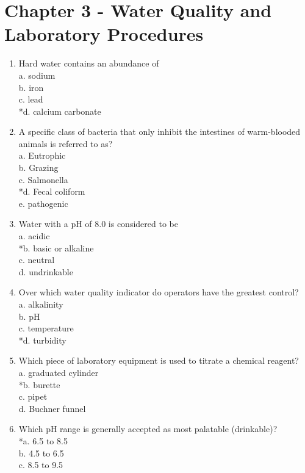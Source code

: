 \newpage
\section{Chapter 3 - Water Quality and Laboratory Procedures}
\begin{enumerate}[1.]

\item Hard water contains an abundance of\\
a. sodium\\
b. iron\\
c. lead\\
*d. calcium carbonate\\
\item A specific class of bacteria that only inhibit the intestines of warm-blooded animals is referred to as?\\
a. Eutrophic\\
b. Grazing\\
c. Salmonella\\
*d. Fecal coliform\\
e. pathogenic\\
\item Water with a pH of 8.0 is considered to be\\
a. acidic\\
*b. basic or alkaline\\
c. neutral\\
d. undrinkable\\
\item Over which water quality indicator do operators have the greatest control?\\
a. alkalinity\\
b. pH\\
c. temperature\\
*d. turbidity\\
\item Which piece of laboratory equipment is used to titrate a chemical reagent?\\
a. graduated cylinder\\
*b. burette\\
c. pipet\\
d. Buchner funnel\\
\item Which pH range is generally accepted as most palatable (drinkable)?\\
*a. 6.5 to 8.5\\
b. 4.5 to 6.5\\
c. 8.5 to 9.5\\

\end{enumerate}
